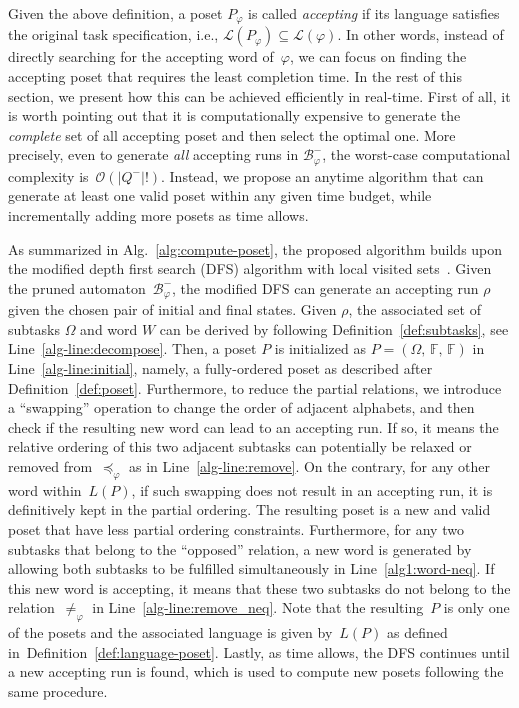 Given the above definition, a poset $P_\varphi$ is called \emph{accepting}
if its language satisfies the original task specification, i.e.,
$\mathcal{L}(P_\varphi)\subseteq \mathcal{L}(\varphi)$.
In other words, instead of directly searching for the accepting word of~$\varphi$,
we can focus on finding the accepting poset that
requires the least completion time.
In the rest of this section, we present how this can be achieved efficiently
in real-time.
First of all, it is worth pointing out that it is computationally expensive to
generate the \emph{complete} set of all accepting poset
and then select the optimal one.
More precisely, even to generate \emph{all} accepting runs in $\mathcal{B}_{\varphi}^-$,
the worst-case computational complexity is~$\mathcal{O}(|Q^-|!)$.
Instead, we propose an anytime algorithm that can generate at least one
valid poset within any given time budget,
while incrementally adding more posets as time allows.


As summarized in Alg.~\ref{alg:compute-poset},
the proposed algorithm builds upon the modified depth first search (DFS)
algorithm with local visited sets~\cite{sedgewick2001algorithms}.
Given the pruned automaton~$\mathcal{B}_{\varphi}^-$,
the modified DFS can generate an accepting run $\rho$ given the chosen pair of
initial and final states.
Given $\rho$, the associated set of subtasks $\Omega$ and word $W$ can be
derived by following Definition~\ref{def:subtasks}, see Line~\ref{alg-line:decompose}.
Then, a poset $P$ is initialized as $P=(\Omega,\, \mathbb{F},\, \mathbb{F})$
in Line~\ref{alg-line:initial},
namely, a fully-ordered poset as described after Definition~\ref{def:poset}.
Furthermore, to reduce the partial relations,
we introduce a ``swapping'' operation to change the order of adjacent alphabets,
and then check if the resulting new word can lead to an accepting run.
If so, it means the relative ordering of this two adjacent subtasks can
potentially be relaxed or removed from~$\preceq_{\varphi}$ as in Line~\ref{alg-line:remove}.
On the contrary, for any other word within~$L(P)$, if such swapping does not
result in an accepting run, it is definitively kept in the partial ordering.
The resulting poset is a new and valid poset that have less partial
ordering constraints.
Furthermore, for any two subtasks that belong to the ``opposed'' relation,
a new word is generated by allowing both subtasks to be fulfilled simultaneously
in Line~\ref{alg1:word-neq}.
If this new word is accepting, it means that these two subtasks do not belong to the
relation~$\neq_{\varphi}$ in Line~\ref{alg-line:remove_neq}.
Note that the resulting~$P$ is only one of the posets and the associated language is
given by~$L(P)$ as defined in~Definition~\ref{def:language-poset}.
Lastly, as time allows, the DFS continues until a new accepting run is found,
which is used to compute new posets following the same procedure.

